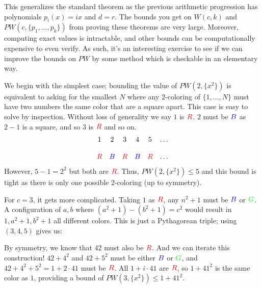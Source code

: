 \documentclass[a4paper]{amsproc}
\theoremstyle{plain}
\newcommand{\RR} {\color{red} R}
\newcommand{\BB} {\color{blue} B}
\newcommand{\GG} {\color{green} G}
\begin{document}
This generalizes the standard theorem as the previous arithmetic progression has polynomials $p_i(x) = ix$ and $d=r$.
The bounds you get on $W(c,k)$ and $PW(c,\{p_1,\ldots,p_k\})$ from proving these theorems are very large.
Moreover, computing exact values is intractable, and other bounds can be computationally expensive to even verify.
As such, it's an interesting exercise to see if we can improve the bounds on $PW$ by some method which is checkable in an elementary way.


We begin with the simplest case; bounding the value of $PW(2,\{x^2\})$ is equivalent to asking for the smallest $N$ where any $2$-coloring of $\{1,\ldots,N\}$ must have two numbers the same color that are a square apart.
This case is easy to solve by inspection.
Without loss of generality we say $1$ is $\RR$.
$2$ must be $\BB$ as $2-1$ is a square, and so $3$ is $\RR$ and so on.
\[\begin{matrix}1&2&3&4&5&\ldots\\\\\RR&\BB&\RR&\BB&\RR&\ldots\end{matrix}\]
However, $5-1=2^2$ but both are $\RR$.
Thus, $PW(2,\{x^2\})\leq 5$ and this bound is tight as there is only one possible $2$-coloring (up to symmetry).

For $c=3$, it gets more complicated.
Taking $1$ as $\RR$, any $n^2+1$ must be $\BB$ or $\GG$.
A configuration of $a,b$ where $(a^2+1)-(b^2+1)=c^2$ would result in $1, a^2+1, b^2+1$ all different colors.
This is just a Pythagorean triple; using $(3,4,5)$ gives us:

\begin{figure}[H]
\caption{}
\label{fig:M0}
\end{figure}

By symmetry, we know that 42 must also be $\RR$.
And we can iterate this construction! $42+4^2$ and $42+5^2$ must be either $\BB$ or $\GG$, and $42+4^2+5^2=1+2\cdot41$ must be $\RR$.
All $1+i\cdot41$ are $\RR$, so $1+41^2$ is the same color as $1$, providing a bound of $PW(3, \{x^2\})\leq 1+41^2$.
\end{document}
